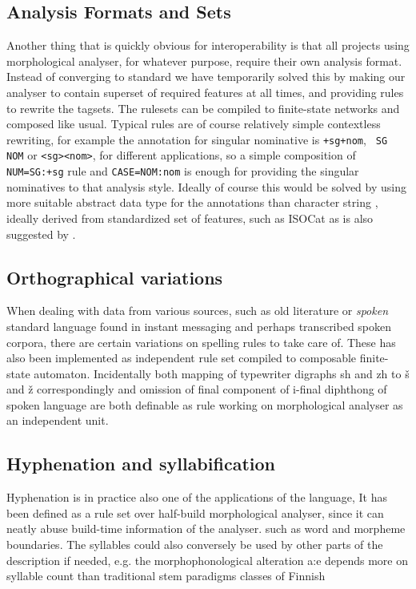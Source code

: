 \documentclass[11pt]{article}
\begin{document}
\subsection{Analysis Formats and Sets}

Another thing that is quickly obvious for interoperability is that all projects
using morphological analyser, for whatever purpose, require their own analysis
format. Instead of converging to standard we have temporarily solved this by
making our analyser to contain superset of required features at all times, and
providing rules to rewrite the tagsets. The rulesets can be compiled to
finite-state networks and composed like usual. Typical rules are of course
relatively simple contextless rewriting, for example the annotation for
singular nominative is \verb|+sg+nom|, \verb| SG NOM| or \verb|<sg><nom>|, for
different applications, so a simple composition of \verb|NUM=SG:+sg| rule and
\verb|CASE=NOM:nom| is enough for providing the singular nominatives to that
analysis style.  Ideally of course this would be solved by using more suitable
abstract data type for the annotations than character string
\cite{wintner/2008}, ideally derived from standardized set of features, such as
ISOCat as is also suggested by \cite{maxwell/2008}.


\subsection{Orthographical variations}

When dealing with data from various sources, such as old literature or
\emph{spoken} standard language found in instant messaging and perhaps
transcribed spoken corpora, there are certain variations on spelling rules to
take care of. These has also been implemented as independent rule set compiled
to composable finite-state automaton. Incidentally both mapping of typewriter
digraphs sh and zh to š and ž correspondingly and omission of final component
of i-final diphthong of spoken language are both definable as rule working on
morphological analyser as an independent unit.

\subsection{Hyphenation and syllabification}

Hyphenation is in practice also one of the applications of the language, It has
been defined as a rule set over half-build morphological analyser, since it can
neatly abuse build-time information of the analyser. such as word and morpheme
boundaries. The syllables could also conversely be used by other parts of the
description if needed, e.g. the morphophonological alteration a:e depends more
on syllable count than traditional stem paradigms classes of Finnish
\end{document}
